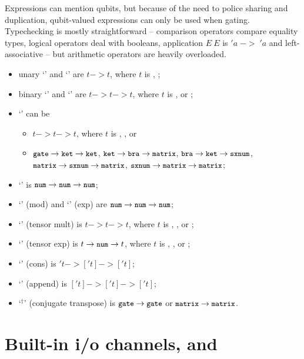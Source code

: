 Expressions can mention qubits, but because of the need to police sharing and duplication, qubit-valued expressions can only be used when gating. Typechecking is mostly straightforward -- comparison operators compare equality types, logical operators deal with booleans, application $E\ E$ is $'a\;->\;'a$ and left-associative -- but arithmetic operators are heavily overloaded.
\begin{itemize}
\item unary `\verbtt{+}' and `\verbtt{-}' are $t->t$, where $t$ is , ;
\item binary `\verbtt{+}' and `\verbtt{-}' are $t->t->t$, where $t$ is ,  or ;
\item `\verbtt{*}' can be 
\begin{itemize}
	\item $t->t->t$, where $t$ is , ,  or 
	\item $\texttt{\small{}gate}->\texttt{\small{}ket}->\texttt{\small{}ket}$, $\texttt{\small{}ket}->\texttt{\small{}bra}->\texttt{\small{}matrix}$, $\texttt{\small{}bra}->\texttt{\small{}ket}->\texttt{\small{}sxnum}$, $\texttt{\small{}matrix}->\texttt{\small{}sxnum}->\texttt{\small{}matrix}$, $\texttt{\small{}sxnum}->\texttt{\small{}matrix}->\texttt{\small{}matrix}$;
\end{itemize}
\item `\verbtt{/}' is $\texttt{\small{}num}->\texttt{\small{}num}->\texttt{\small{}num}$;
\item `\verbtt{\%}' (mod) and `\verbtt{**}' (exp) are $\texttt{\small{}num}->\texttt{\small{}num}->\texttt{\small{}num}$;
\item `' (tensor mult) is $t->t->t$, where $t$ is , ,  or ;
\item `' (tensor exp) is $t->\texttt{\small{}num}->t$, where $t$ is , ,  or ;
\item `\verbtt{::}' (cons) is $'t->['t]->['t]$;
\item `' (append) is $['t]->['t]->['t]$;
\item `\ensuremath{^{\dag}}' (conjugate transpose) is $\texttt{\small{}gate}->\texttt{\small{}gate}$ or $\texttt{\small{}matrix}->\texttt{\small{}matrix}$.
\end{itemize}


\section{Built-in i/o channels,  and }

